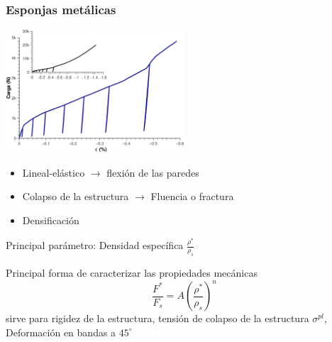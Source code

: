\documentclass[usenames,dvipsnames]{beamer}
\begin{document}
\begin{frame}
\frametitle{Esponjas metálicas}

\begin{multicols}{2}

\includegraphics[width=0.5\textwidth]{img/intro/Cucompararesponja.eps}

\begin{itemize}
\small
 \item \alert<1>{Lineal-elástico $\rightarrow$ flexión de las paredes }
 \item \alert<2>{Colapso de la estructura $\rightarrow$ Fluencia o fractura}
 \item \alert<3>{Densificación  }
\end{itemize}

\end{multicols}
\alert<4>{Principal parámetro: Densidad específica $\frac{\rho^*}{\rho_s}$}

Principal forma de caracterizar las propiedades mecánicas 
\alert<5>{
\begin{equation*}
\frac{F^*}{F_s}=A \left(\frac{\rho^*}{\rho_s}\right)^n \label{props} 
\end{equation*}
}
sirve para rigidez de la estructura, tensión de colapso de la estructura $\sigma^{pl}$,
Deformación en bandas a $45 ^\circ$

\end{frame}

\end{document}
